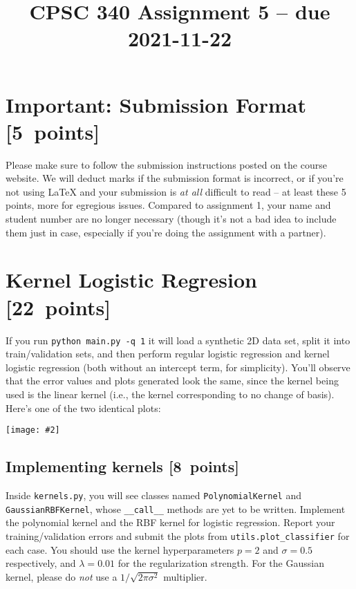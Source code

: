 \documentclass{article}
\newcommand{\blu}[1]{{\textcolor{blu}{#1}}}
\let\ask\blu
\newenvironment{asking}{\begingroup\color{blu}}{\endgroup}
\newcommand\pts[1]{\textcolor{pointscolour}{[#1~points]}}
\newcommand{\centerfig}[2]{\begin{center}\texttt{[image: \#2]}\end{center}}
\begin{document}
\title{CPSC 340 Assignment 5 -- due 2021-11-22}
\date{}
\maketitle
\vspace{-6em}



\section*{Important: Submission Format \pts{5}}

Please make sure to follow the submission instructions posted on the course website.
\ask{We will deduct marks if the submission format is incorrect, or if you're not using \LaTeX{} and your submission is \emph{at all} difficult to read} -- at least these 5 points, more for egregious issues.
Compared to assignment 1, your name and student number are no longer necessary (though it's not a bad idea to include them just in case, especially if you're doing the assignment with a partner).

\vspace{1em}



\section{Kernel Logistic Regresion \pts{22}}

If you run \verb|python main.py -q 1| it will load a synthetic 2D data set, split it into train/validation sets, and then perform regular logistic regression and kernel logistic regression (both without an intercept term, for simplicity). You'll observe that the error values and plots generated look the same, since the kernel being used is the linear kernel (i.e., the kernel corresponding to no change of basis). Here's one of the two identical plots:
\centerfig{0.5}{figs/logReg.png}


\subsection{Implementing kernels \pts{8}}

Inside \texttt{kernels.py}, you will see classes named \texttt{PolynomialKernel} and \texttt{GaussianRBFKernel}, whose \verb|__call__| methods are yet to be written.
\begin{asking}
  Implement the polynomial kernel and the RBF kernel for logistic regression.
  Report your training/validation errors and submit the plots from \verb|utils.plot_classifier| for each case.
\end{asking}
You should use the kernel hyperparameters $p=2$ and $\sigma=0.5$ respectively,
and $\lambda=0.01$ for the regularization strength.
For the Gaussian kernel, please do \emph{not} use a $1/\sqrt{2\pi\sigma^2}$ multiplier.
\end{document}
